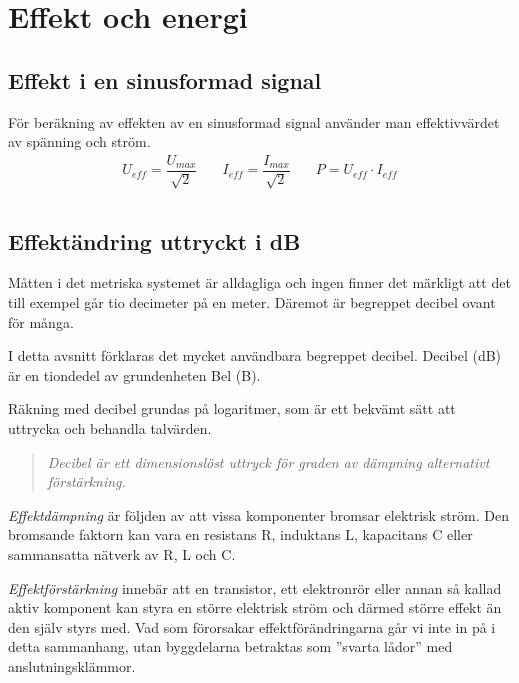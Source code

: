 \section{Effekt och energi}
\label{effect och energi}

\subsection{Effekt i en sinusformad signal}

För beräkning av effekten av en sinusformad signal använder man effektivvärdet
av spänning och ström.
\[\begin{array}{ccc}
    U_{\textit{eff}} = \dfrac{U_{max}}{\sqrt{2}} &
    \quad I_{\textit{eff}} = \dfrac{I_{max}}{\sqrt{2}} &
    \quad P = U_{\textit{eff}} \cdot I_{\textit{eff}} \\
    \end{array}\]


\subsection{Effektändring uttryckt i dB}
\label{decibel}

Måtten i det metriska systemet är alldagliga och ingen finner det märkligt att
det till exempel går tio decimeter på en meter.
Däremot är begreppet decibel ovant för många.

I detta avsnitt förklaras det mycket användbara begreppet decibel.
Decibel (dB) är en tiondedel av grundenheten Bel (B).

Räkning med decibel grundas på logaritmer, som är ett bekvämt sätt att uttrycka
och behandla talvärden.

\begin{quote}\emph{
Decibel är ett dimensionslöst uttryck för graden av dämpning alternativt
förstärkning.
}\end{quote}

\emph{Effektdämpning} är följden av att vissa komponenter bromsar elektrisk
ström.
Den bromsande faktorn kan vara en resistans R, induktans L, kapacitans C eller
sammansatta nätverk av R, L och C.

\emph{Effektförstärkning} innebär att en transistor, ett elektronrör eller
annan så kallad aktiv komponent kan styra en större elektrisk ström och därmed
större effekt än den själv styrs med.
Vad som förorsakar effektförändringarna går vi inte in på i detta sammanhang,
utan byggdelarna betraktas som ''svarta lådor'' med anslutningsklämmor.

